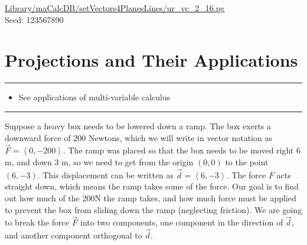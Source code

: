 \documentclass[10pt,]{book}
\theoremstyle{plain}
\theoremstyle{definition}
\theoremstyle{definition}
\theoremstyle{definition}
\theoremstyle{definition}
\newenvironment{objectives}[1]{\noindent\rule{\linewidth}{0.1ex}\newline{\textbf{{\large#1}}\par\smallskip}}{\par\noindent\rule{\linewidth}{0.1ex}\par\smallskip}
\theoremstyle{definition}
\numberwithin{equation}{section}
\newcommand{\lt}{<}
\begin{document}
\begin{exerciselist}
\begin{mdframed}
{}\par\vspace*{2ex}%
{\tiny\ttfamily\noindent\url{Library/maCalcDB/setVectors4PlanesLines/ur_vc_2_16.pg}\\Seed: 123567890\hfill}\end{mdframed}
\end{exerciselist}
\typeout{************************************************}
\typeout{************************************************}
\section[{Projections and Their Applications}]{Projections and Their Applications}\label{section-10}
\begin{objectives}{Objectives}\label{objectives-7}
%
\begin{itemize}[label=\textbullet]
\item{}See applications of multi-variable calculus%
\end{itemize}
\end{objectives}
Suppose a heavy box needs to be lowered down a ramp. The box exerts a downward force of 200 Newtons, which we will write in vector notation as \(\vec F=\left\lt 0,-200\right>\). The ramp was placed so that the box needs to be moved right 6 m, and down 3 m, so we need to get from the origin \((0,0)\) to the point \((6,-3)\). This displacement can be written as \(\vec d=\left\lt 6,-3\right>\). The force \(F\) acts straight down, which means the ramp takes some of the force. Our goal is to find out how much of the 200N the ramp takes, and how much force must be applied to prevent the box from sliding down the ramp (neglecting friction). We are going to break the force \(\vec F\) into two components, one component in the direction of \(\vec d\), and another component orthogonal to \(\vec d\).%
\end{document}

